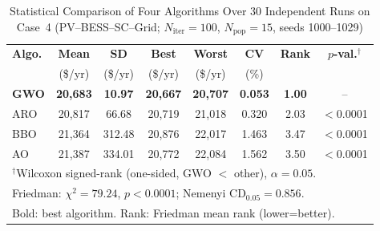 \begin{table}[!t]
\caption{Statistical Comparison of Four Algorithms Over 30 Independent
  Runs on Case~4 (PV--BESS--SC--Grid;
  $N_\mathrm{iter}=100$, $N_\mathrm{pop}=15$,
  seeds 1000--1029)}
\label{tab:stats30}
\centering
\setlength{\tabcolsep}{3.5pt}
\begin{tabular}{lccccccc}
\toprule
\textbf{Algo.} &
  \textbf{Mean} &
  \textbf{SD} &
  \textbf{Best} &
  \textbf{Worst} &
  \textbf{CV} &
  \textbf{Rank} &
  \textbf{$p$-val.$^\dagger$} \\
 & (\$/yr) & (\$/yr) & (\$/yr) & (\$/yr) & (\%) & & \\
\midrule
\textbf{GWO} &
  \textbf{20{,}683} & \textbf{10.97} &
  \textbf{20{,}667} & \textbf{20{,}707} &
  \textbf{0.053} & \textbf{1.00} & -- \\
ARO &
  20{,}817 & 66.68 &
  20{,}719 & 21{,}018 &
  0.320 & 2.03 & $<$0.0001 \\
BBO &
  21{,}364 & 312.48 &
  20{,}876 & 22{,}017 &
  1.463 & 3.47 & $<$0.0001 \\
AO &
  21{,}387 & 334.01 &
  20{,}772 & 22{,}084 &
  1.562 & 3.50 & $<$0.0001 \\
\bottomrule
\multicolumn{8}{l}{\footnotesize
  $^\dagger$Wilcoxon signed-rank (one-sided, GWO $<$ other), $\alpha=0.05$.}\\
\multicolumn{8}{l}{\footnotesize
  Friedman: $\chi^{2}=79.24$, $p<0.0001$;
  Nemenyi CD$_{0.05}=0.856$.}\\
\multicolumn{8}{l}{\footnotesize
  Bold: best algorithm. Rank: Friedman mean rank (lower=better).}\\
\end{tabular}
\end{table}
